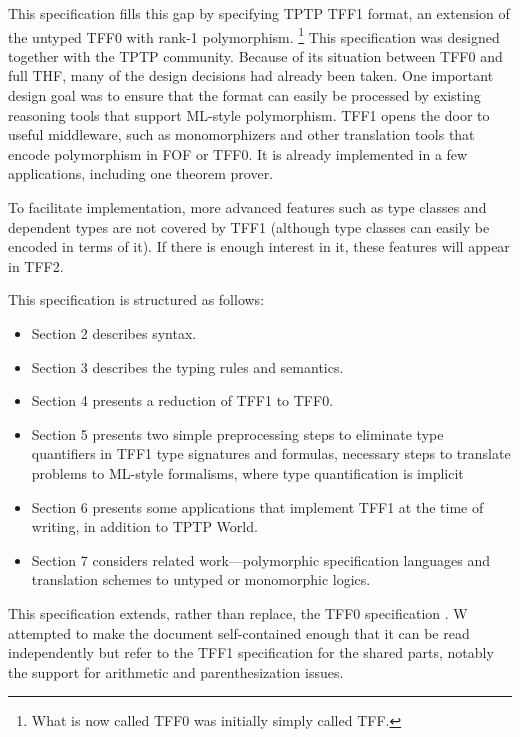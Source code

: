 This specification fills this gap by specifying TPTP TFF1 format, an extension
of the untyped TFF0 with rank-1 polymorphism.%
\footnote{What is now called TFF0 was initially simply called TFF.}
This specification was designed together with the TPTP community. Because of its
situation between TFF0 and full THF, many of the design decisions had already
been taken. One important design goal was to ensure that the format can easily
be processed by existing reasoning tools that support ML-style polymorphism.
TFF1 opens the door to useful middleware, such as monomorphizers and other
translation tools that encode polymorphism in FOF or TFF0. It is already
implemented in a few applications, including one theorem prover.

To facilitate implementation, more advanced features such as type classes and
dependent types are not covered by TFF1 (although type classes can easily be
encoded in terms of it). If there is enough interest in it, these features will
appear in TFF2.

This specification is structured as follows:
\begin{itemize}
\item Section 2 describes syntax.
\item Section 3 describes the typing rules and semantics.
\item Section 4 presents a reduction of TFF1 to TFF0.
\item Section 5 presents two simple preprocessing steps to eliminate type
quantifiers in TFF1 type signatures and formulas, necessary steps to translate
problems to ML-style formalisms, where type quantification is implicit
\item Section 6 presents some applications that implement TFF1 at the time of
writing, in addition to TPTP World.
\item Section 7 considers related work---polymorphic specification languages
and translation schemes to untyped or monomorphic logics.
\end{itemize}

This specification extends, rather than replace, the TFF0 specification
\cite{TFF0}. W attempted to make the document self-contained enough that it can
be read independently but refer to the TFF1 specification for the shared parts,
notably the support for arithmetic and parenthesization issues.
